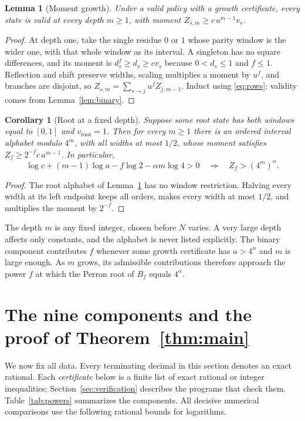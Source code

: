\documentclass[11pt]{article}
\newtheorem{lemma}[theorem]{Lemma}
\newtheorem{corollary}[theorem]{Corollary}
\theoremstyle{definition}
\theoremstyle{remark}
\begin{document}
\begin{lemma}[Moment growth]\label{lem:growth}
Under a valid policy with a growth certificate, every state is valid at every
depth $m\ge1$, with moment $Z_{s,m}\ge c\,a^{m-1}v_s$.
\end{lemma}
\begin{proof}
At depth one, take the single residue $0$ or $1$ whose parity window is the
wider one, with that whole window as its interval. A singleton has no square
differences, and its moment is $d_s^f\ge d_s\ge cv_s$ because $0<d_s\le1$ and
$f\le1$. Reflection and shift preserve widths, scaling multiplies a moment by
$u^f$, and branches are disjoint, so $Z_{s,m}=\sum_{s\to j}u^fZ_{j,m-1}$.
Induct using \eqref{eq:rows}; validity comes from Lemma~\ref{lem:binary}.
\end{proof}

\begin{corollary}[Root at a fixed depth]\label{cor:bindepth}
Suppose some \emph{root} state has both windows equal to $[0,1]$ and
$v_{\mathrm{root}}=1$. Then for every $m\ge1$ there is an ordered interval
alphabet modulo $4^m$, with all widths at most $1/2$, whose moment satisfies
$Z_f\ge 2^{-f}c\,a^{m-1}$. In particular,
\begin{equation}\label{eq:binarymargin}
 \log c+(m-1)\log a-f\log2-\alpha m\log4>0
 \quad\Longrightarrow\quad Z_f>(4^m)^\alpha .
\end{equation}
\end{corollary}
\begin{proof}
The root alphabet of Lemma~\ref{lem:growth} has no window restriction.
Halving every width at its left endpoint keeps all orders, makes every width
at most $1/2$, and multiplies the moment by $2^{-f}$.
\end{proof}
The depth $m$ is any fixed integer, chosen before $N$ varies. A very large
depth affects only constants, and the alphabet is never listed explicitly.
The binary component contributes $f$ whenever some growth certificate has
$a>4^\alpha$ and $m$ is large enough. As $m$ grows, its admissible
contributions therefore approach the power $f$ at which the Perron root of
$B_f$ equals $4^\alpha$.

\section{The nine components and the proof of Theorem~\ref{thm:main}}\label{sec:parameters}
We now fix all data. Every terminating decimal in this section denotes an
exact rational. Each \emph{certificate} below is a finite list of exact
rational or integer inequalities; Section~\ref{sec:verification} describes
the programs that check them. Table~\ref{tab:powers} summarizes the
components. All decisive numerical comparisons use the following rational
bounds for logarithms.
\end{document}
